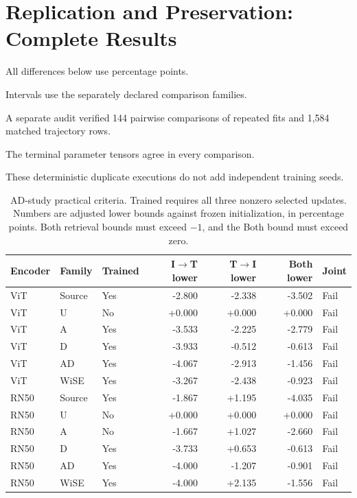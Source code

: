 \section{Replication and Preservation: Complete Results}

\label{app:newresults}

All differences below use percentage points.

Intervals use the separately declared comparison families.

A separate audit verified 144 pairwise comparisons of repeated fits and 1,584 matched trajectory rows.

The terminal parameter tensors agree in every comparison.

These deterministic duplicate executions do not add independent training seeds.

\begin{table}[t]
\centering
\small
\setlength{\tabcolsep}{3pt}
\begin{tabular}{lllrrrl}
\toprule
Encoder & Family & Trained & I$\to$T lower & T$\to$I lower & Both lower & Joint\\
\midrule
ViT & Source & Yes & -2.800 & -2.338 & -3.502 & Fail\\
ViT & U & No & +0.000 & +0.000 & +0.000 & Fail\\
ViT & A & Yes & -3.533 & -2.225 & -2.779 & Fail\\
ViT & D & Yes & -3.933 & -0.512 & -0.613 & Fail\\
ViT & AD & Yes & -4.067 & -2.913 & -1.456 & Fail\\
ViT & WiSE & Yes & -3.267 & -2.438 & -0.923 & Fail\\
RN50 & Source & Yes & -1.867 & +1.195 & -4.035 & Fail\\
RN50 & U & No & +0.000 & +0.000 & +0.000 & Fail\\
RN50 & A & No & -1.667 & +1.027 & -2.660 & Fail\\
RN50 & D & Yes & -3.733 & +0.653 & -0.613 & Fail\\
RN50 & AD & Yes & -4.000 & -1.207 & -0.901 & Fail\\
RN50 & WiSE & Yes & -4.000 & +2.135 & -1.556 & Fail\\
\bottomrule
\end{tabular}
\caption{AD-study practical criteria. Trained requires all three nonzero selected updates. Numbers are adjusted lower bounds against frozen initialization, in percentage points. Both retrieval bounds must exceed $-1$, and the Both bound must exceed zero.}\label{tab:newgates}
\end{table}


